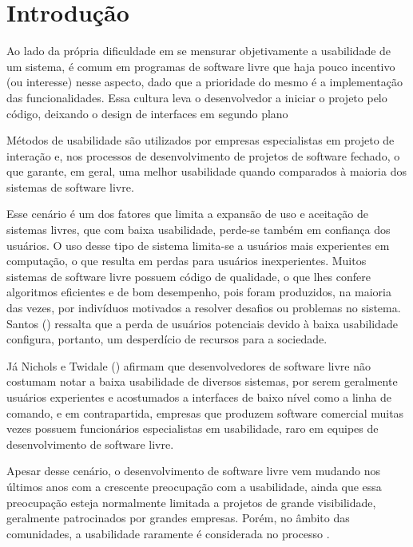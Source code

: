\chapter{Introdução}
\label{cap-introducao}

Ao lado da própria dificuldade em se mensurar objetivamente a usabilidade de um sistema, é comum em programas de software livre que haja pouco incentivo (ou interesse) nesse aspecto, dado que a prioridade do mesmo é a implementação das funcionalidades. Essa cultura leva o desenvolvedor a iniciar o projeto pelo código, deixando o design de interfaces em segundo plano~\cite{thomas2008} 
%

Métodos de usabilidade são utilizados por empresas especialistas em projeto de interação e, nos processos de desenvolvimento de projetos de software fechado, o que garante, em geral, uma melhor usabilidade quando comparados à maioria dos sistemas de software livre.
%

Esse cenário é um dos fatores que limita a expansão de uso e aceitação de sistemas livres, que com baixa usabilidade, perde-se também em confiança dos usuários. O uso desse tipo de sistema limita-se a usuários mais experientes em computação, o que resulta em perdas para usuários inexperientes. Muitos sistemas de software livre possuem código de qualidade, o que lhes confere algoritmos eficientes e de bom desempenho, pois foram produzidos, na maioria das vezes, por indivíduos motivados a resolver desafios ou problemas no sistema. Santos (\citeyear{santos2012}) ressalta que a perda de usuários potenciais devido à baixa usabilidade configura, portanto, um desperdício de recursos para a sociedade.

%
Já Nichols e Twidale (\citeyear{nichols2006}) afirmam que desenvolvedores de software livre não costumam notar a baixa usabilidade de diversos sistemas, por serem geralmente usuários experientes e acostumados a interfaces de baixo nível como a linha de comando, e em contrapartida, empresas que produzem software comercial muitas vezes possuem funcionários especialistas em usabilidade, raro em equipes de desenvolvimento de software livre.
%

Apesar desse cenário, o desenvolvimento de software livre vem mudando nos últimos anos com a crescente preocupação com a usabilidade, ainda que essa preocupação esteja normalmente limitada a projetos de grande visibilidade, geralmente patrocinados por grandes empresas. Porém, no âmbito das comunidades, a usabilidade raramente é considerada no processo \cite{nichols2006}.

